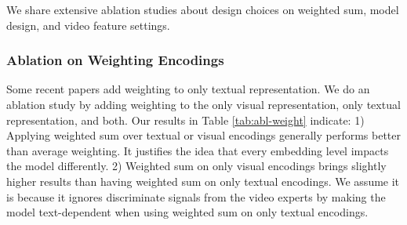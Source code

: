 \documentclass[lettersize,journal]{IEEEtran}
\begin{document}
We share extensive ablation studies about design choices on weighted sum, model design, and video feature settings.

\subsubsection{Ablation on Weighting Encodings}

Some recent papers add weighting to only textual representation. We do an ablation study by adding weighting to the only visual representation, only textual representation, and both. Our results in Table \ref{tab:abl-weight} indicate: 1) Applying weighted sum over textual or visual encodings generally performs better than average weighting. It justifies the idea that every embedding level impacts the model differently. 2) Weighted sum on only visual encodings brings slightly higher results than having weighted sum on only textual encodings. We assume it is because it ignores discriminate signals from the video experts by making the model text-dependent when using weighted sum on only textual encodings.
\end{document}
